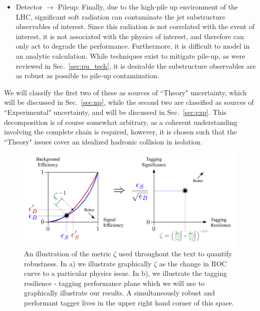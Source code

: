 \documentclass[11pt,letterpaper]{article}
\DeclareRobustCommand{\Sec}[1]{Sec.~\ref{#1}}
\begin{document}
\begin{itemize}
\item Detector $\to$ Pileup: Finally, due to the high-pile up environment of the LHC, significant soft radiation can contaminate the jet substructure observables of interest. Since this radiation is not correlated with the event of interest, it is not associated with the physics of interest, and therefore can only act to degrade the performance. Furthermore, it is difficult to model in an analytic calculation. While techniques exist to mitigate pile-up, as were reviewed in \Sec{sec:pu_tech}, it is desirable the substructure observables are as robust as possible to pile-up contamination.
\end{itemize}
We will classify the first two of these as sources of ``Theory" uncertainty, which will be discussed in \Sec{sec:np}, while the second two are classified as sources of ``Experimental" uncertainty, and will be discussed in \Sec{sec:exp}. This decomposition is of course somewhat arbitrary, as a coherent understanding involving the complete chain is required, however, it is chosen such that the ``Theory" issues cover an idealized hadronic collision in isolation. 

\begin{figure}
\begin{center}
\includegraphics[width=1.0\columnwidth]{figures/roc_to_significance}
\end{center}
\caption{An illustration of the metric $\zeta$ used throughout the text to quantify robustness. In a) we illustrate graphically $\zeta$ as the change in ROC curve to a particular physics issue. In b), we illustrate the tagging resilience - tagging performance plane which we will use to graphically illustrate our results. A simultaneously robust and performant tagger lives in the upper right hand corner of this space. }
\label{fig:zeta_def}
\end{figure}
\end{document}
